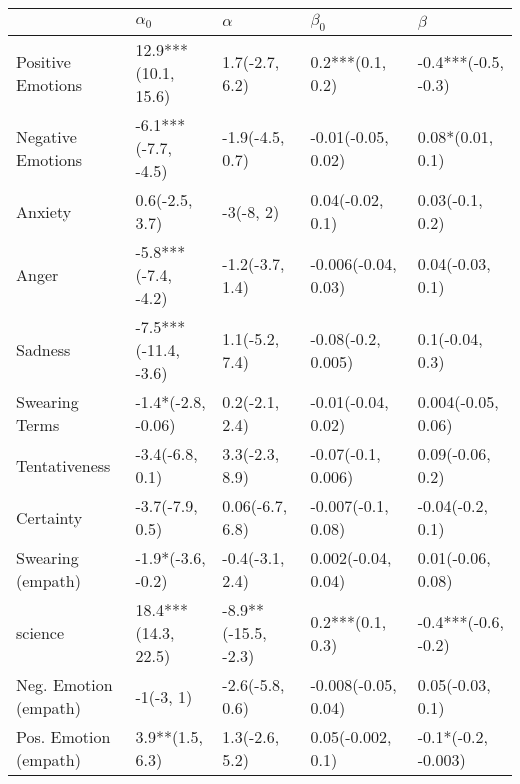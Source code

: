 \begin{tabular}{lllll}
\toprule
{} &            $\alpha_0$ &             $\alpha$ &            $\beta_0$ &              $\beta$ \\
\midrule
Positive Emotions     &   12.9***(10.1, 15.6) &       1.7(-2.7, 6.2) &     0.2***(0.1, 0.2) &  -0.4***(-0.5, -0.3) \\
Negative Emotions     &   -6.1***(-7.7, -4.5) &      -1.9(-4.5, 0.7) &   -0.01(-0.05, 0.02) &     0.08*(0.01, 0.1) \\
Anxiety               &        0.6(-2.5, 3.7) &            -3(-8, 2) &     0.04(-0.02, 0.1) &      0.03(-0.1, 0.2) \\
Anger                 &   -5.8***(-7.4, -4.2) &      -1.2(-3.7, 1.4) &  -0.006(-0.04, 0.03) &     0.04(-0.03, 0.1) \\
Sadness               &  -7.5***(-11.4, -3.6) &       1.1(-5.2, 7.4) &   -0.08(-0.2, 0.005) &      0.1(-0.04, 0.3) \\
Swearing Terms        &    -1.4*(-2.8, -0.06) &       0.2(-2.1, 2.4) &   -0.01(-0.04, 0.02) &   0.004(-0.05, 0.06) \\
Tentativeness         &       -3.4(-6.8, 0.1) &       3.3(-2.3, 8.9) &   -0.07(-0.1, 0.006) &     0.09(-0.06, 0.2) \\
Certainty             &       -3.7(-7.9, 0.5) &      0.06(-6.7, 6.8) &   -0.007(-0.1, 0.08) &     -0.04(-0.2, 0.1) \\
Swearing (empath)     &     -1.9*(-3.6, -0.2) &      -0.4(-3.1, 2.4) &   0.002(-0.04, 0.04) &    0.01(-0.06, 0.08) \\
science               &   18.4***(14.3, 22.5) &  -8.9**(-15.5, -2.3) &     0.2***(0.1, 0.3) &  -0.4***(-0.6, -0.2) \\
Neg. Emotion (empath) &             -1(-3, 1) &      -2.6(-5.8, 0.6) &  -0.008(-0.05, 0.04) &     0.05(-0.03, 0.1) \\
Pos. Emotion (empath) &       3.9**(1.5, 6.3) &       1.3(-2.6, 5.2) &    0.05(-0.002, 0.1) &  -0.1*(-0.2, -0.003) \\
\bottomrule
\end{tabular}
